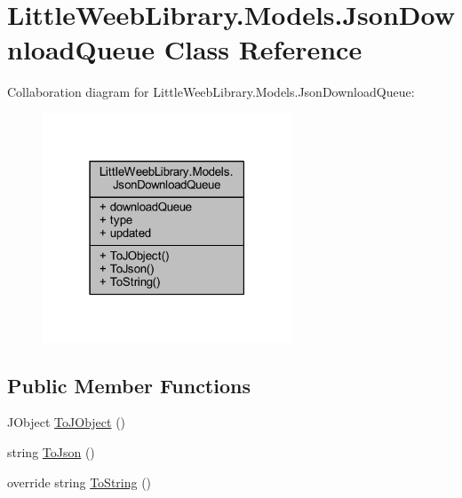 \hypertarget{class_little_weeb_library_1_1_models_1_1_json_download_queue}{}\section{Little\+Weeb\+Library.\+Models.\+Json\+Download\+Queue Class Reference}
\label{class_little_weeb_library_1_1_models_1_1_json_download_queue}


Collaboration diagram for Little\+Weeb\+Library.\+Models.\+Json\+Download\+Queue\+:\nopagebreak
\begin{figure}[H]
\begin{center}
\leavevmode
\includegraphics[width=210pt]{class_little_weeb_library_1_1_models_1_1_json_download_queue__coll__graph}
\end{center}
\end{figure}
\subsection*{Public Member Functions}
\begin{DoxyCompactItemize}
\item 
J\+Object \mbox{\hyperlink{class_little_weeb_library_1_1_models_1_1_json_download_queue_a1d77053fc493aa88857bcafd6fea4bf7}{To\+J\+Object}} ()
\item 
string \mbox{\hyperlink{class_little_weeb_library_1_1_models_1_1_json_download_queue_a0cf0692da69b7c4ab44b7983db377c64}{To\+Json}} ()
\item 
override string \mbox{\hyperlink{class_little_weeb_library_1_1_models_1_1_json_download_queue_a0613fd2171f103708bdc981048f3b80c}{To\+String}} ()
\end{DoxyCompactItemize}
